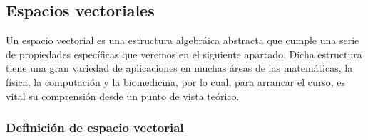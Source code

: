 \documentclass[12pt,dvipsnames]{article}
\begin{document}
\newpage
\subsection{Espacios vectoriales} \label{Subsec:Espacios_vectoriales}

Un espacio vectorial es una estructura algebráica abstracta que cumple una serie de propiedades específicas que veremos en el siguiente apartado. Dicha estructura tiene una gran variedad de aplicaciones en muchas áreas de las matemáticas, la física, la computación y la biomedicina, por lo cual, para arrancar el curso, es vital su comprensión desde un punto de vista teórico.

\subsubsection{Definición de espacio vectorial} \label{Def:Espacio_vectorial}
\end{document}
